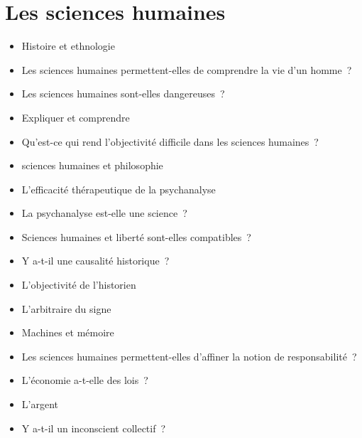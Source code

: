 \documentclass[a4paper,11pt]{article}
\newenvironment{liste}{\begin{itemize}}{\end{itemize}}
\begin{document}
\section{Les sciences humaines}

\begin{liste}
\item Histoire et ethnologie
\item Les sciences humaines permettent-elles de comprendre la vie d'un
  homme~?
\item Les sciences humaines sont-elles dangereuses~?
\item Expliquer et comprendre
\item Qu'est-ce qui rend l'objectivité difficile dans les sciences
  humaines~?
\item sciences humaines et philosophie
\item L'efficacité thérapeutique de la psychanalyse
\item La psychanalyse est-elle une science~?
\item Sciences humaines et liberté sont-elles compatibles~?
\item Y a-t-il une causalité historique~?
\item L'objectivité de l'historien
\item L'arbitraire du signe
\item Machines et mémoire
\item Les sciences humaines permettent-elles d'affiner la notion de
  responsabilité~?
\item L'économie a-t-elle des lois~?
\item L'argent
\item Y a-t-il un inconscient collectif~? 
\end{liste}
\end{document}
